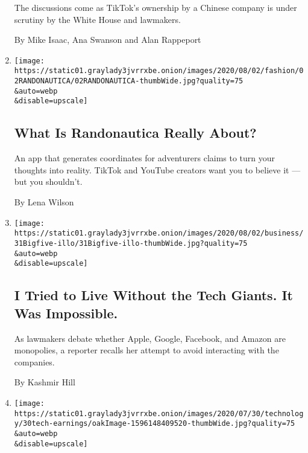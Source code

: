 \begin{enumerate}
  The discussions come as TikTok's ownership by a Chinese company is
  under scrutiny by the White House and lawmakers.

  By Mike Isaac, Ana Swanson and Alan Rappeport
\item
  \href{/2020/07/31/style/randonautica-app.html}{}

  \texttt{[image: https://static01.graylady3jvrrxbe.onion/images/2020/08/02/fashion/02RANDONAUTICA/02RANDONAUTICA-thumbWide.jpg?quality=75\\\&auto=webp\\\&disable=upscale]}

  \hypertarget{what-is-randonautica-really-about}{%
  \subsection{What Is Randonautica Really
  About?}\label{what-is-randonautica-really-about}}

  An app that generates coordinates for adventurers claims to turn your
  thoughts into reality. TikTok and YouTube creators want you to believe
  it --- but you shouldn't.

  By Lena Wilson
\item
  \href{/2020/07/31/technology/blocking-the-tech-giants.html}{}

  \texttt{[image: https://static01.graylady3jvrrxbe.onion/images/2020/08/02/business/31Bigfive-illo/31Bigfive-illo-thumbWide.jpg?quality=75\\\&auto=webp\\\&disable=upscale]}

  \hypertarget{i-tried-to-live-without-the-tech-giants-it-was-impossible}{%
  \subsection{I Tried to Live Without the Tech Giants. It Was
  Impossible.}\label{i-tried-to-live-without-the-tech-giants-it-was-impossible}}

  As lawmakers debate whether Apple, Google, Facebook, and Amazon are
  monopolies, a reporter recalls her attempt to avoid interacting with
  the companies.

  By Kashmir Hill
\item
  \href{/2020/07/30/technology/tech-company-earnings-amazon-apple-facebook-google.html}{}

  \texttt{[image: https://static01.graylady3jvrrxbe.onion/images/2020/07/30/technology/30tech-earnings/oakImage-1596148409520-thumbWide.jpg?quality=75\\\&auto=webp\\\&disable=upscale]}

  \hypertarget{the-economy-is-in-record-decline-but-not-for-the-tech-giants}{%
}
\end{enumerate}
